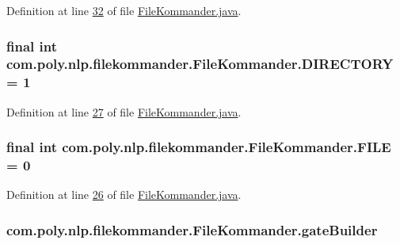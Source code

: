 Definition at line \hyperlink{L32}{32} of file \hyperlink{}{File\-Kommander.\-java}.

\hypertarget{classcom_1_1poly_1_1nlp_1_1filekommander_1_1_file_kommander_a081a142e5d7bb0d0fe5cf38c2f4dc086}{
\subsubsection[{D\-I\-R\-E\-C\-T\-O\-R\-Y}]{\setlength{\rightskip}{0pt plus 5cm}final int com.\-poly.\-nlp.\-filekommander.\-File\-Kommander.\-D\-I\-R\-E\-C\-T\-O\-R\-Y = 1\hspace{0.3cm}{\ttfamily [static]}}}\label{classcom_1_1poly_1_1nlp_1_1filekommander_1_1_file_kommander_a081a142e5d7bb0d0fe5cf38c2f4dc086}


Definition at line \hyperlink{L27}{27} of file \hyperlink{}{File\-Kommander.\-java}.

\hypertarget{classcom_1_1poly_1_1nlp_1_1filekommander_1_1_file_kommander_abc599ad8072f7091b61322af4d8fb40e}{
\subsubsection[{F\-I\-L\-E}]{\setlength{\rightskip}{0pt plus 5cm}final int com.\-poly.\-nlp.\-filekommander.\-File\-Kommander.\-F\-I\-L\-E = 0\hspace{0.3cm}{\ttfamily [static]}}}\label{classcom_1_1poly_1_1nlp_1_1filekommander_1_1_file_kommander_abc599ad8072f7091b61322af4d8fb40e}


Definition at line \hyperlink{L26}{26} of file \hyperlink{}{File\-Kommander.\-java}.

\hypertarget{classcom_1_1poly_1_1nlp_1_1filekommander_1_1_file_kommander_a49132471a5825278776bfb4a84d8caa0}{
\subsubsection[{gate\-Builder}]{ com.\-poly.\-nlp.\-filekommander.\-File\-Kommander.\-gate\-Builder\hspace{0.3cm}{\ttfamily [private]}}}\label{classcom_1_1poly_1_1nlp_1_1filekommander_1_1_file_kommander_a49132471a5825278776bfb4a84d8caa0}


